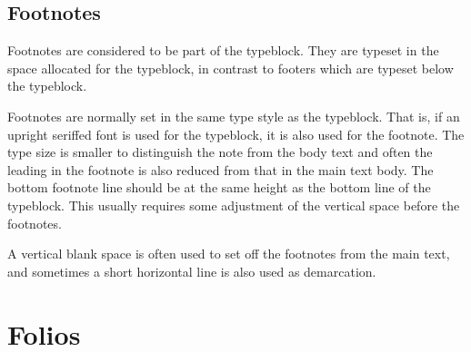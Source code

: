 \documentclass[10pt,a4paper,extrafontsizes]{memoir}
\begin{document}

\subsection{Footnotes}

\begin{paracol}{2}
\switchEng
    Footnotes are considered to be part of the typeblock. 
They are typeset in the space allocated for the typeblock, 
in contrast to footers
which are typeset below the typeblock.

    Footnotes are normally set in the same type style as the 
typeblock. That is, if an upright seriffed font is used 
for the typeblock, it is
also used for the footnote. The
type size is smaller to distinguish the note from the body text and often
the leading in the footnote is also reduced from that in the main text body.
The bottom footnote line should be at the same height as the bottom line
of the typeblock. This usually requires some adjustment 
of the vertical space before the footnotes.

    A vertical blank space is often used to set off the footnotes from the
main text, and sometimes a short horizontal line is also used as demarcation.
\end{paracol}


\section{Folios}
\end{document}
